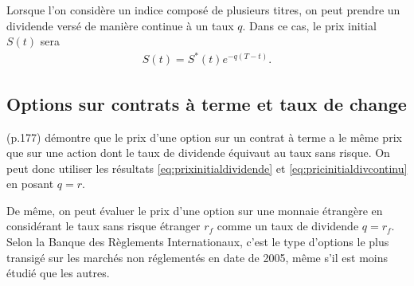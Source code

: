 Lorsque l'on considère un indice composé de plusieurs titres, on peut
prendre un dividende versé de manière continue à un taux $q$. Dans ce
cas, le prix initial $S(t)$ sera
\begin{align}
  \label{eq:pricinitialdivcontinu}
  S(t) = S^{*}(t) e^{-q(T-t)}.
\end{align}

\subsection{Options sur contrats à terme et taux de change}
\label{sec:futureoptions}

\cite{black1976pricing} (p.177) démontre que le prix d'une option sur
un contrat à terme a le même prix que sur une action dont le taux de
dividende équivaut au taux sans risque. On peut donc utiliser les
résultats \eqref{eq:prixinitialdividende} et
\eqref{eq:pricinitialdivcontinu} en posant $q=r$.

De même, on peut évaluer le prix d'une option sur une monnaie
étrangère en considérant le taux sans risque étranger $r_f$ comme un
taux de dividende $q=r_f$. Selon la Banque des Règlements
Internationaux, c'est le type d'options le plus transigé sur les
marchés non réglementés en date de 2005, même s'il est moins étudié
que les autres.







